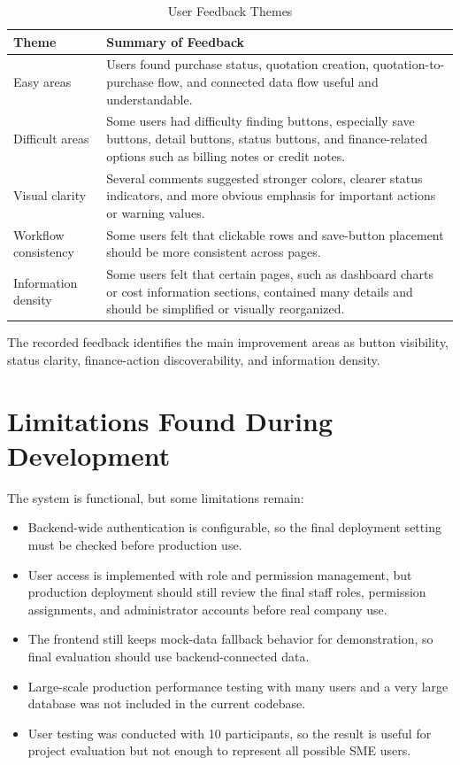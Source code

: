 \begin{table}[H]
	\centering
	\BlackbookTableSetup
	\caption{User Feedback Themes}
	\label{tab:user-feedback-themes}
	\begin{tabularx}{\textwidth}{|B{3.5cm}|Z|}
		\hline
		\textbf{Theme} & \textbf{Summary of Feedback} \\ \hline
		Easy areas & Users found purchase status, quotation creation, quotation-to-purchase flow, and connected data flow useful and understandable. \\ \hline
		Difficult areas & Some users had difficulty finding buttons, especially save buttons, detail buttons, status buttons, and finance-related options such as billing notes or credit notes. \\ \hline
		Visual clarity & Several comments suggested stronger colors, clearer status indicators, and more obvious emphasis for important actions or warning values. \\ \hline
		Workflow consistency & Some users felt that clickable rows and save-button placement should be more consistent across pages. \\ \hline
		Information density & Some users felt that certain pages, such as dashboard charts or cost information sections, contained many details and should be simplified or visually reorganized. \\ \hline
	\end{tabularx}
\end{table}

The recorded feedback identifies the main improvement areas as button visibility, status clarity, finance-action discoverability, and information density.

\section{Limitations Found During Development}
The system is functional, but some limitations remain:

\begin{itemize}
	\item Backend-wide authentication is configurable, so the final deployment setting must be checked before production use.
	\item User access is implemented with role and permission management, but production deployment should still review the final staff roles, permission assignments, and administrator accounts before real company use.
	\item The frontend still keeps mock-data fallback behavior for demonstration, so final evaluation should use backend-connected data.
	\item Large-scale production performance testing with many users and a very large database was not included in the current codebase.
	\item User testing was conducted with 10 participants, so the result is useful for project evaluation but not enough to represent all possible SME users.
\end{itemize}
